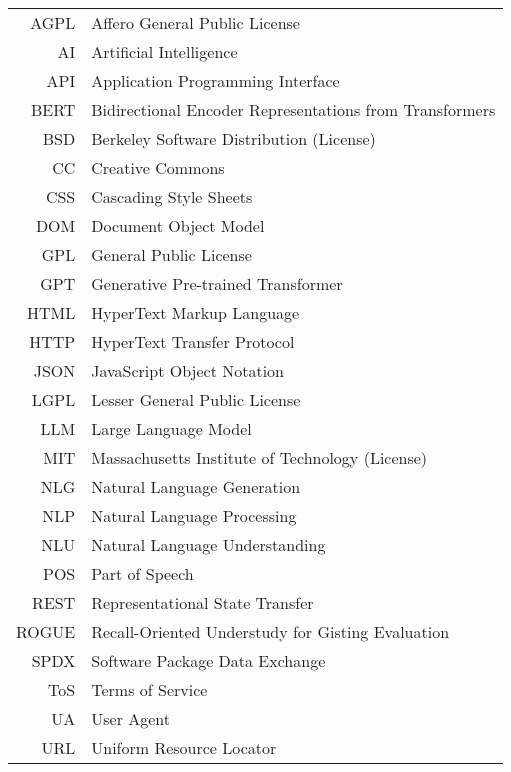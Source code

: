 \documentclass[czech,bachelor,unicode,oneside]{ctufit-thesis}
\begin{document}
\begin{tabular}{rl}
    AGPL & Affero General Public License \\
    AI & Artificial Intelligence \\
    API & Application Programming Interface \\
    BERT & Bidirectional Encoder Representations from Transformers \\
    BSD & Berkeley Software Distribution (License) \\
    CC & Creative Commons \\
    CSS & Cascading Style Sheets \\
    DOM & Document Object Model \\
    GPL & General Public License \\
    GPT & Generative Pre-trained Transformer \\
    HTML & HyperText Markup Language \\
    HTTP & HyperText Transfer Protocol \\
    JSON & JavaScript Object Notation \\
    LGPL & Lesser General Public License \\
    LLM & Large Language Model \\
    MIT & Massachusetts Institute of Technology (License) \\
    NLG & Natural Language Generation \\
    NLP & Natural Language Processing \\
    NLU & Natural Language Understanding \\
    POS & Part of Speech \\
    REST & Representational State Transfer \\
    ROGUE & Recall-Oriented Understudy for Gisting Evaluation \\
    SPDX & Software Package Data Exchange \\
    ToS & Terms of Service \\
    UA & User Agent \\
    URL & Uniform Resource Locator \\
\end{tabular}
\resumeTOCentries
\mainmatter\mainmatterinit %


\appendix\appendixinit %


\backmatter %

\printbibliography %

\end{document}

